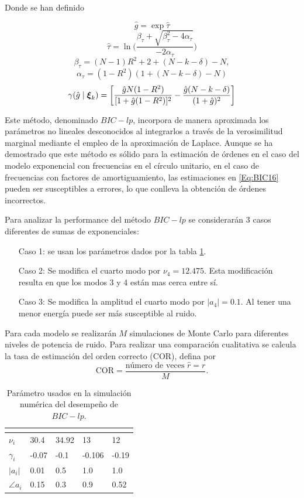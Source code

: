 Donde se han definido

\[\hat{g} = \exp\hat{\tau}\]
\[\hat{\tau} = \ln\bigg(\frac{\beta_\tau + \sqrt{\beta_\tau^2 - 4\alpha_\tau}}{-2\alpha_\tau}\bigg)\]
\[\beta_\tau = (N-1)R^2 + 2 + (N-k-\delta) - N,\]
\[\alpha_\tau = (1-R^2)(1+(N-k-\delta) - N)\]
\[\gamma(\hat{g}\mid\boldsymbol{\xi}_k) = \bigg[\frac{\hat{g}N(1-R^2)}{[1+\hat{g}(1-R^2)]^2}-\frac{\hat{g}(N-k-\delta)}{(1+\hat{g})^2}\bigg]\]

Este método, denominado $BIC-lp$, incorpora de manera aproximada los parámetros no lineales desconocidos al integrarlos a través de la verosimilitud marginal mediante el empleo de la aproximación de Laplace. Aunque se ha demostrado que este método es sólido para la estimación de órdenes en el caso del modelo exponencial con frecuencias en el círculo unitario, en el caso de frecuencias con factores de amortiguamiento, las estimaciones en \eqref{Eq:BIC16} pueden ser susceptibles a errores, lo que conlleva la obtención de órdenes incorrectos.

Para analizar la performance del método $BIC-lp$ se considerarán 3 casos diferentes de sumas de exponenciales:
\begin{itemize}
	\item[Caso 1:] se usan los parámetros dados por la tabla \ref{Tab:vexpa_parameters_bic}.
	\item[Caso 2:] Se modifica el cuarto modo por  $\nu_4 = 12.475$. Esta modificación resulta en que los modos 3 y 4 están mas cerca entre sí.
	\item[Caso 3:] Se modifica la amplitud el cuarto modo por $|a_4|=0.1$. Al tener una menor energía puede ser más susceptible al ruido.
\end{itemize}

Para cada modelo se realizarán $M$ simulaciones de Monte Carlo para diferentes niveles de potencia de ruido. Para realizar una comparación cualitativa se calcula la tasa de estimación del orden correcto (COR), defina por
\[\mathrm{COR} = \frac{\text{número de veces } \hat{r}=r}{M}.\]

\begin{table}[ht]
	\centering
	\begin{tabular}{l|llll}
		& \multicolumn{4}{l}{}  \\ \hline
		$\nu_i$        & 30.4  & 34.92   & 13   & 12    \\
		$\gamma_i$     & -0.07  & -0.1   & -0.106 & -0.19 \\ 
		$|a_i|$      & 0.01 & 0.5     & 1.0     & 1.0    \\
		$\angle a_i$ & 0.15    & 0.3    & 0.9    & 0.52    \\ \hline
	\end{tabular}
	\caption{Parámetro usados en la simulación numérica del desempeño de $BIC-lp$.}
	\label{Tab:vexpa_parameters_bic}
\end{table}

